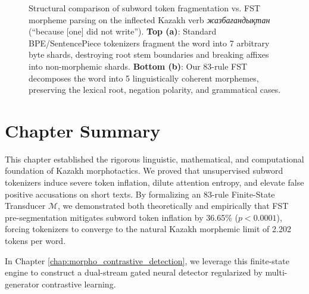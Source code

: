 \begin{figure}[t]
{
}
\caption{Structural comparison of subword token fragmentation vs. FST morpheme parsing on the inflected Kazakh verb \textit{жазбағандықтан} (``because [one] did not write''). \textbf{Top (a)}: Standard BPE/SentencePiece tokenizers fragment the word into 7 arbitrary byte shards, destroying root stem boundaries and breaking affixes into non-morphemic shards. \textbf{Bottom (b)}: Our 83-rule FST decomposes the word into 5 linguistically coherent morphemes, preserving the lexical root, negation polarity, and grammatical cases.}
\label{fig:token_fragmentation_tree}
\end{figure}

\section{Chapter Summary}
\label{sec:ling_summary}

This chapter established the rigorous linguistic, mathematical, and computational foundation of Kazakh morphotactics. We proved that unsupervised subword tokenizers induce severe token inflation, dilute attention entropy, and elevate false positive accusations on short texts. By formalizing an 83-rule Finite-State Transducer $\mathcal{M}$, we demonstrated both theoretically and empirically that FST pre-segmentation mitigates subword token inflation by 36.65\% ($p < 0.0001$), forcing tokenizers to converge to the natural Kazakh morphemic limit of 2.202 tokens per word. 

In Chapter \ref{chap:morpho_contrastive_detection}, we leverage this finite-state engine to construct a dual-stream gated neural detector regularized by multi-generator contrastive learning.

